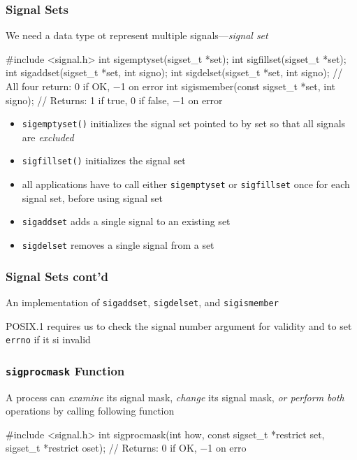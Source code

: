 \documentclass[newPxFont,sthlmFooter,nooffset]{beamer}
\begin{document}
\begin{frame}[fragile,t]
  \frametitle{Signal Sets}
We need a data type ot represent multiple signals---\textit{signal set}

\begin{codedef}
#include <signal.h>
int sigemptyset(sigset_t *set);
int sigfillset(sigset_t *set);
int sigaddset(sigset_t *set, int signo); 
int sigdelset(sigset_t *set, int signo);
// All four return: 0 if OK, −1 on error 
int sigismember(const sigset_t *set, int signo);
// Returns: 1 if true, 0 if false, −1 on error
\end{codedef}

\begin{itemize}
\item \footnotesize \texttt{sigemptyset()} initializes the signal set pointed to by set so that all signals are \textit{excluded}
\item \footnotesize \texttt{sigfillset()} initializes the signal set
\item \footnotesize all applications have to call either \texttt{sigemptyset} or \texttt{sigfillset} once for each signal set, before using signal set
\item \footnotesize \texttt{sigaddset} adds a single signal to an existing set
\item \footnotesize \texttt{sigdelset} removes a single signal from a set
\end{itemize}

\end{frame}








\begin{frame}
  \frametitle{Signal Sets cont'd}
An implementation of \texttt{sigaddset}, \texttt{sigdelset}, and \texttt{sigismember}


POSIX.1 requires us to check the signal number argument for validity and to set \texttt{errno} if it si invalid
\end{frame}



\begin{frame}[fragile,t]
  \frametitle{\texttt{sigprocmask} Function}
A process can \textit{examine} its signal mask, \textit{change} its signal mask, \textit{or perform both} operations by calling following function

\begin{codedef}
#include <signal.h>
int sigprocmask(int how, const sigset_t *restrict set, 
                sigset_t *restrict oset);
// Returns: 0 if OK, −1 on erro    
\end{codedef}
\end{frame}
\end{document}
